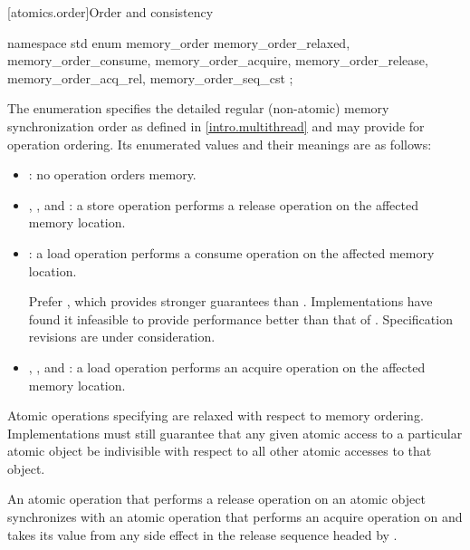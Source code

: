 [atomics.order]{Order and consistency}

\begin{codeblock}
namespace std {
  enum memory_order {
    memory_order_relaxed, memory_order_consume, memory_order_acquire,
    memory_order_release, memory_order_acq_rel, memory_order_seq_cst
  };
}
\end{codeblock}

\pnum
The enumeration  specifies the detailed regular
(non-atomic) memory synchronization order as defined in
\ref{intro.multithread} and may provide for operation ordering. Its
enumerated values and their meanings are as follows:

\begin{itemize}
\item {}: no operation orders memory.

\item {}, , and
: a store operation performs a release operation on the
affected memory location.

\item {}: a load operation performs a consume operation on the
affected memory location.
\begin{note} Prefer , which provides stronger guarantees
than . Implementations have found it infeasible
to provide performance better than that of .
Specification revisions are under consideration. \end{note}

\item {}, , and
: a load operation performs an acquire operation on the
affected memory location.
\end{itemize}

\begin{note} Atomic operations specifying  are relaxed
with respect to memory ordering. Implementations must still guarantee that any
given atomic access to a particular atomic object be indivisible with respect
to all other atomic accesses to that object. \end{note}

\pnum
An atomic operation  that performs a release operation on an atomic
object  synchronizes with an atomic operation  that performs
an acquire operation on  and takes its value from any side effect in the
release sequence headed by .

